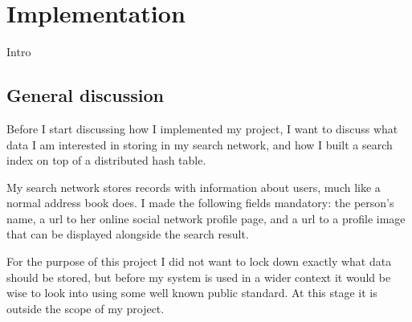 

\section{Implementation}

Intro


\subsection{General discussion}
Before I start discussing how I implemented my project, I want to discuss what data I am interested in storing in my search network, and how I built a search index on top of a distributed hash table. 

\mbox{}

My search network stores records with information about users, much like a normal address book does. I made the following fields mandatory: the person's name, a url to her online social network profile page, and a url to a profile image that can be displayed alongside the search result.

For the purpose of this project I did not want to lock down exactly what data should be stored, but before my system is used in a wider context it would be wise to look into using some well known public standard. At this stage it is outside the scope of my project.

